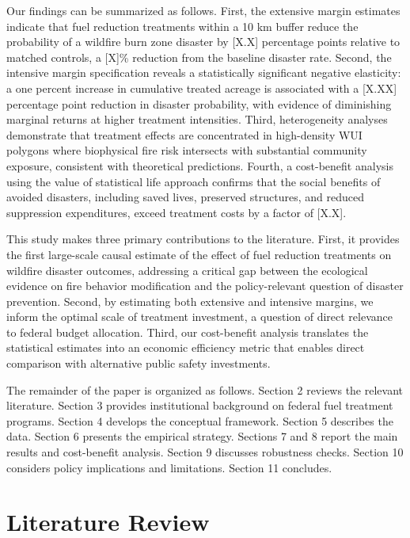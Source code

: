\documentclass[12pt, letterpaper]{article}
\begin{document}
Our findings can be summarized as follows. First, the extensive margin estimates indicate that fuel reduction treatments within a 10 km buffer reduce the probability of a wildfire burn zone disaster by [X.X] percentage points relative to matched controls, a [X]\% reduction from the baseline disaster rate. Second, the intensive margin specification reveals a statistically significant negative elasticity: a one percent increase in cumulative treated acreage is associated with a [X.XX] percentage point reduction in disaster probability, with evidence of diminishing marginal returns at higher treatment intensities. Third, heterogeneity analyses demonstrate that treatment effects are concentrated in high-density WUI polygons where biophysical fire risk intersects with substantial community exposure, consistent with theoretical predictions. Fourth, a cost-benefit analysis using the value of statistical life approach confirms that the social benefits of avoided disasters, including saved lives, preserved structures, and reduced suppression expenditures, exceed treatment costs by a factor of [X.X].

This study makes three primary contributions to the literature. First, it provides the first large-scale causal estimate of the effect of fuel reduction treatments on wildfire disaster outcomes, addressing a critical gap between the ecological evidence on fire behavior modification and the policy-relevant question of disaster prevention. Second, by estimating both extensive and intensive margins, we inform the optimal scale of treatment investment, a question of direct relevance to federal budget allocation. Third, our cost-benefit analysis translates the statistical estimates into an economic efficiency metric that enables direct comparison with alternative public safety investments.

The remainder of the paper is organized as follows. Section 2 reviews the relevant literature. Section 3 provides institutional background on federal fuel treatment programs. Section 4 develops the conceptual framework. Section 5 describes the data. Section 6 presents the empirical strategy. Sections 7 and 8 report the main results and cost-benefit analysis. Section 9 discusses robustness checks. Section 10 considers policy implications and limitations. Section 11 concludes.


\section{Literature Review}
\end{document}
